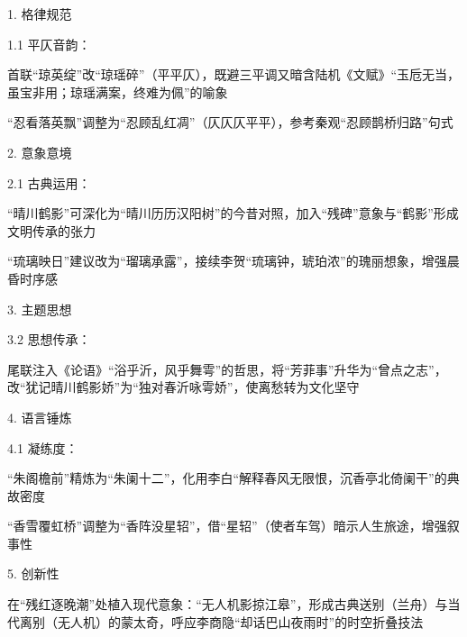 \begin{tcolorbox}[
  colback=white, %
  colframe=black, 
  boxrule=1pt,        %
  arc=0mm             %
  ]
  \kaishu 
  1. 格律规范\par
  \hspace{2em}1.1 平仄音韵：\par
  \hspace{2em}首联“琼英绽”改“琼瑶碎”（平平仄），既避三平调又暗含陆机《文赋》“玉卮无当，虽宝非用；琼瑶满案，终难为佩”的喻象\par
  \hspace{2em}“忍看落英飘”调整为“忍顾乱红凋”（仄仄仄平平），参考秦观“忍顾鹊桥归路”句式\par
  2. 意象意境\par
  \hspace{2em}2.1 古典运用：\par
  \hspace{2em}“晴川鹤影”可深化为“晴川历历汉阳树”的今昔对照，加入“残碑”意象与“鹤影”形成文明传承的张力\par
  \hspace{2em}“琉璃映日”建议改为“瑠璃承露”，接续李贺“琉璃钟，琥珀浓”的瑰丽想象，增强晨昏时序感\par
  3. 主题思想\par
  \hspace{2em}3.2 思想传承：\par
  \hspace{2em}尾联注入《论语》“浴乎沂，风乎舞雩”的哲思，将“芳菲事”升华为“曾点之志”，改“犹记晴川鹤影娇”为“独对春沂咏雩娇”，使离愁转为文化坚守\par
  4. 语言锤炼\par
  \hspace{2em}4.1 凝练度：\par
  \hspace{2em}“朱阁檐前”精炼为“朱阑十二”，化用李白“解释春风无限恨，沉香亭北倚阑干”的典故密度\par
  \hspace{2em}“香雪覆虹桥”调整为“香阵没星轺”，借“星轺”（使者车驾）暗示人生旅途，增强叙事性\par
  5. 创新性\par
  \hspace{2em}在“残红逐晚潮”处植入现代意象：“无人机影掠江皋”，形成古典送别（兰舟）与当代离别（无人机）的蒙太奇，呼应李商隐“却话巴山夜雨时”的时空折叠技法\par

\end{tcolorbox}


